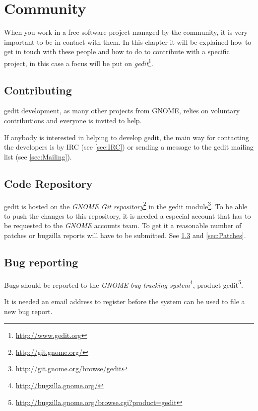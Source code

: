 
\chapter{Community}\label{chap:community}

When you work in a free software project managed by the community, it is very important to be in contact with them. In this chapter it will be explained how to get in touch with these people and how to do to contribute with a specific project, in this case a focus will be put on \emph{gedit}\footnote{\url{http://www.gedit.org}}.

\section{Contributing}\label{sec:Contributing}

gedit development, as many other projects from GNOME, relies on voluntary contributions and everyone is invited to help.

If anybody is interested in helping to develop gedit, the main way for contacting the developers is by IRC (see \ref{sec:IRC}) or sending a message to the gedit mailing list (see \ref{sec:Mailing}).

\section{Code Repository}\label{sec:Repository}

gedit is hosted on the \emph{GNOME Git repository}\footnote{\url{http://git.gnome.org/}} in the gedit module\footnote{\url{http://git.gnome.org/browse/gedit}}. To be able to push the changes to this repository, it is needed a especial account that has to be requested to the \emph{GNOME} accounts team. To get it a reasonable number of patches or bugzilla reports will have to be submitted. See \ref{sec:Bugs} and \ref{sec:Patches}.

\section{Bug reporting}\label{sec:Bugs}

Bugs should be reported to the \emph{GNOME bug tracking system}\footnote{\url{http://bugzilla.gnome.org/}}, product gedit\footnote{\url{http://bugzilla.gnome.org/browse.cgi?product=gedit}}.

It is needed an email address to register before the system can be used to file a new bug report.

